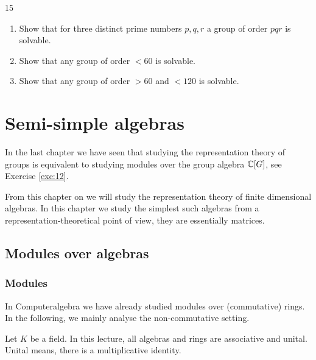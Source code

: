 \documentclass[twoside = false,	%
		headsepline,		%
		parskip = true,
		]{scrbook}						%
\begin{document}
    \begin{exercise}{}{15}
        \begin{enumerate}
            \item Show that for three distinct prime numbers $p,q,r$ a group of order $pqr$ is solvable.
            \item Show that any group of order $<60$ is solvable.
            \item Show that any group of order $>60$ and $<120$ is solvable. 
        \end{enumerate}
    \end{exercise}
    
%        
    
\chapter{Semi-simple algebras}
    In the last chapter we have seen that studying the representation theory of groups is equivalent to studying modules over the group algebra $\mathbb C[G]$, see Exercise \ref{exe:12}.

    From this chapter on we will study the representation theory of finite dimensional algebras. In this chapter we study the simplest such algebras from a representation-theoretical point of view, they are essentially matrices.
\section{Modules over algebras}
    \subsection{Modules}
        In Computeralgebra \cite{Cobra} we have already studied modules over (commutative) rings. In the following, we mainly analyse the non-commutative setting.

        Let $K$ be a field. In this lecture, all algebras and rings are associative and unital. Unital means, there is a multiplicative identity.
\end{document}
